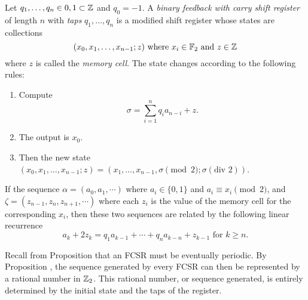 \begin{definition}\label{def:fcsr}
  Let $q_1,\dots,q_n\in{0,1}\subset\mathbb{Z}$ and $q_0=-1$. A {\em binary feedback with carry shift register} 
  of length $n$ with {\em taps} $q_1,\dots,q_n$ is a modified shift register
  whose states are collections
  \[
  (x_0,x_1,\dots,x_{n-1};z) \text{ where } x_i\in\mathbb{F}_2 \text{ and } z \in \mathbb{Z}
  \]
  where $z$ is called the {\it memory cell}. The state changes according
  to the following rules:
  \begin{enumerate}[1.]
    \item Compute
      \[
      \sigma = \sum^n_{i=1}q_ia_{n-i}+z.
      \]
    \item The output is $x_0$.
    \item Then the new state $(x_0,x_1,\dots,x_{n-1};z)
      =(x_1,\dots,x_{n-1},\sigma\pmod2;\sigma(\text{div }2))$.
  \end{enumerate}
\end{definition}

\begin{lemma}\label{lem:linear-recur}
\par If the sequence $\alpha=(a_0,a_1,\cdots)$ where $a_i\in\{0,1\}$ and
$a_i\equiv x_i\pmod2$, and $\zeta=(z_{n-1},z_n,z_{n+1},\cdots)$ where each
$z_i$ is the value of the memory cell for the corresponding $x_i$, then
these two sequences are related by the following linear recurrence
\begin{equation}\label{eqn:lin-rec}
  a_k+2z_k=q_1a_{k-1}+\cdots+q_na_{k-n}+z_{k-1} \text{ for } k\geq n.
\end{equation}
\end{lemma}

\par Recall from Proposition \label{prop:golomb-2} that an FCSR must be
eventually periodic. By Proposition \label{prop:rational-periodic}, the sequence
generated by every FCSR can then be represented by a rational number in
$\mathbb{Z}_2$. This rational number, or sequence generated, is entirely determined by
the initial state and the taps of the register.

